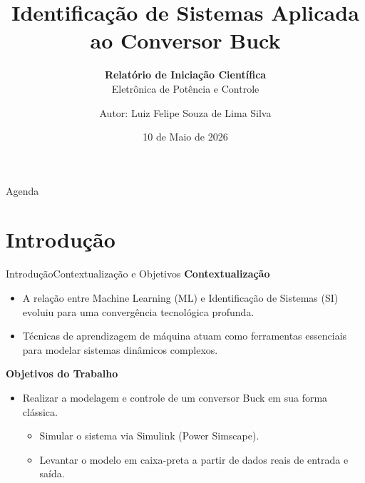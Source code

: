 \documentclass[8pt,aspectratio = 169]{beamer}
\title[] 
{ 
      \textbf{Identificação de Sistemas Aplicada ao Conversor Buck}
}
\subtitle[]
{
    \textbf{Relatório de Iniciação Científica\\}
    Eletrônica de Potência e Controle
}
\author[Luiz Felipe Souza de Lima Silva]
{ \normalsize     
      Autor: Luiz Felipe Souza de Lima Silva 
}
\institute[]
{\small
      Universidade Federal do Pará (UFPA) \\
      Faculdade de Engenharia Elétrica \\
}
\date{10 de Maio de 2026}
\begin{document}
\begin{frame} 
  \titlepage 
\end{frame}

\begin{frame}{Agenda}{}
\tableofcontents
\end{frame}

\section{Introdução}
\begin{frame}{Introdução}{Contextualização e Objetivos}
\textbf{Contextualização}
        \begin{itemize}
             \item A relação entre Machine Learning (ML) e Identificação de Sistemas (SI) evoluiu para uma convergência tecnológica profunda.
             \item Técnicas de aprendizagem de máquina atuam como ferramentas essenciais para modelar sistemas dinâmicos complexos.
         \end{itemize}
\textbf{Objetivos do Trabalho}
        \begin{itemize}
            \item Realizar a modelagem e controle de um conversor Buck em sua forma clássica.
            \begin{itemize}
                  \item Simular o sistema via Simulink (Power Simscape).
                  \item Levantar o modelo em caixa-preta a partir de dados reais de entrada e saída.
             \end{itemize} 
         \end{itemize} 
\end{frame}

\end{document}

